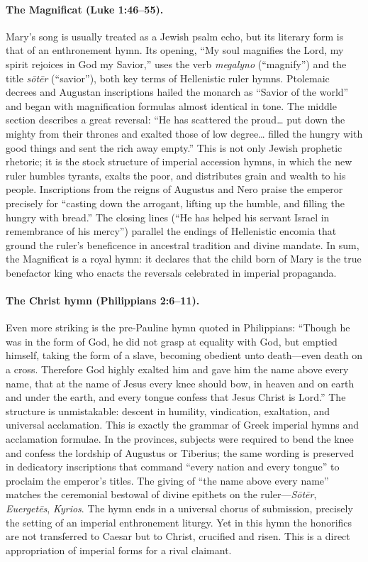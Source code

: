 \paragraph{The Magnificat (Luke 1:46–55).}
Mary’s song is usually treated as a Jewish psalm echo, but its literary form is that of an enthronement hymn.
Its opening, “My soul magnifies the Lord, my spirit rejoices in God my Savior,” uses the verb \emph{megalyno} (“magnify”) and the title \emph{sōtēr} (“savior”), both key terms of Hellenistic ruler hymns.
Ptolemaic decrees and Augustan inscriptions hailed the monarch as “Savior of the world” and began with magnification formulas almost identical in tone.
The middle section describes a great reversal: “He has scattered the proud… put down the mighty from their thrones and exalted those of low degree… filled the hungry with good things and sent the rich away empty.”
This is not only Jewish prophetic rhetoric; it is the stock structure of imperial accession hymns, in which the new ruler humbles tyrants, exalts the poor, and distributes grain and wealth to his people.
Inscriptions from the reigns of Augustus and Nero praise the emperor precisely for “casting down the arrogant, lifting up the humble, and filling the hungry with bread.”
The closing lines (“He has helped his servant Israel in remembrance of his mercy”) parallel the endings of Hellenistic encomia that ground the ruler’s beneficence in ancestral tradition and divine mandate.
In sum, the Magnificat is a royal hymn: it declares that the child born of Mary is the true benefactor king who enacts the reversals celebrated in imperial propaganda.

\paragraph{The Christ hymn (Philippians 2:6–11).}
Even more striking is the pre-Pauline hymn quoted in Philippians:
“Though he was in the form of God, he did not grasp at equality with God,
but emptied himself, taking the form of a slave,
becoming obedient unto death—even death on a cross.
Therefore God highly exalted him
and gave him the name above every name,
that at the name of Jesus every knee should bow,
in heaven and on earth and under the earth,
and every tongue confess that Jesus Christ is Lord.”
The structure is unmistakable: descent in humility, vindication, exaltation, and universal acclamation.
This is exactly the grammar of Greek imperial hymns and acclamation formulae.
In the provinces, subjects were required to bend the knee and confess the lordship of Augustus or Tiberius; the same wording is preserved in dedicatory inscriptions that command “every nation and every tongue” to proclaim the emperor’s titles.
The giving of “the name above every name” matches the ceremonial bestowal of divine epithets on the ruler—\emph{Sōtēr}, \emph{Euergetēs}, \emph{Kyrios}.
The hymn ends in a universal chorus of submission, precisely the setting of an imperial enthronement liturgy.
Yet in this hymn the honorifics are not transferred to Caesar but to Christ, crucified and risen.
This is a direct appropriation of imperial forms for a rival claimant.

